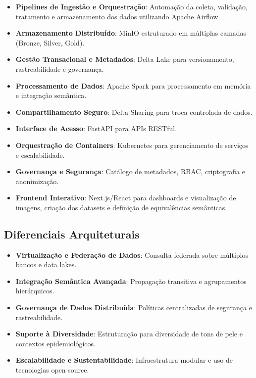 \begin{itemize}
    \item \textbf{Pipelines de Ingestão e Orquestração}: Automação da coleta, validação, tratamento e armazenamento dos dados utilizando Apache Airflow.
    \item \textbf{Armazenamento Distribuído}: MinIO estruturado em múltiplas camadas (Bronze, Silver, Gold).
    \item \textbf{Gestão Transacional e Metadados}: Delta Lake para versionamento, rastreabilidade e governança.
    \item \textbf{Processamento de Dados}: Apache Spark para processamento em memória e integração semântica.
    \item \textbf{Compartilhamento Seguro}: Delta Sharing para troca controlada de dados.
    \item \textbf{Interface de Acesso}: FastAPI para APIs RESTful.
    \item \textbf{Orquestração de Containers}: Kubernetes para gerenciamento de serviços e escalabilidade.
    \item \textbf{Governança e Segurança}: Catálogo de metadados, RBAC, criptografia e anonimização.
    \item \textbf{Frontend Interativo}: Next.js/React para dashboards e visualização de imagens, criação dos datasets e definição de equivalências semânticas.
\end{itemize}

\subsection{Diferenciais Arquiteturais}

\begin{itemize}
    \item \textbf{Virtualização e Federação de Dados}: Consulta federada sobre múltiplos bancos e data lakes.
    \item \textbf{Integração Semântica Avançada}: Propagação transitiva e agrupamentos hierárquicos.
    \item \textbf{Governança de Dados Distribuída}: Políticas centralizadas de segurança e rastreabilidade.
    \item \textbf{Suporte à Diversidade}: Estruturação para diversidade de tons de pele e contextos epidemiológicos.
    \item \textbf{Escalabilidade e Sustentabilidade}: Infraestrutura modular e uso de tecnologias open source.
\end{itemize}

